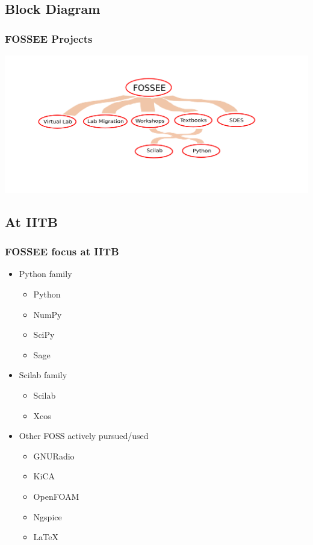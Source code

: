 \documentclass[compress,red]{beamer} %
\begin{document}
\subsection{Block Diagram}
\begin{frame}
\frametitle{FOSSEE Projects}
\begin{center}
\includegraphics[scale=0.3]{blockdiagram.png}
\end{center}
\end{frame}

\subsection{At IITB}
\begin{frame}
\frametitle{FOSSEE focus at IITB}
\begin{itemize}
\item Python family \pause
   \begin{itemize}
   \item Python
   \item NumPy
   \item SciPy
   \item Sage \pause
   \end{itemize}
\item Scilab family \pause
   \begin{itemize}
   \item Scilab
   \item Xcos \pause
   \end{itemize}
\item Other FOSS actively pursued/used \pause
   \begin{itemize}
   \item GNURadio
   \item KiCA
   \item OpenFOAM
   \item Ngspice
   \item \LaTeX %
   \end{itemize}
\end{itemize}
\end{frame}
\end{document}
